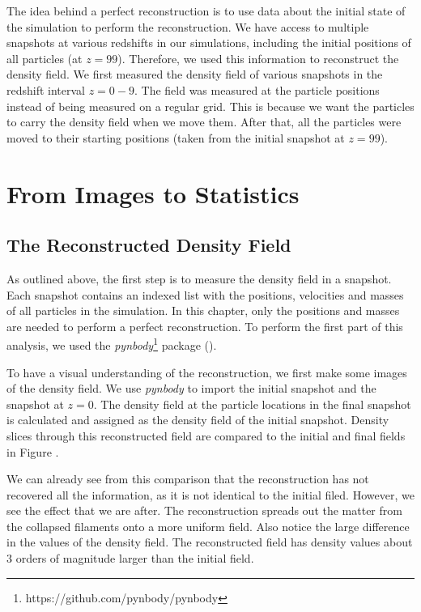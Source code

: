 
The idea behind a perfect reconstruction is to use data about the initial state of the simulation to perform the reconstruction. We have access to multiple snapshots at various redshifts in our simulations, including the initial positions of all particles (at $z = 99$). Therefore, we used this information to reconstruct the density field. We first measured the density field of various snapshots in the redshift interval $z = 0 - 9$. The field was measured at the particle positions instead of being measured on a regular grid. This is because we want the particles to carry the density field when we move them. After that, all the particles were moved to their starting positions (taken from the initial snapshot at $z = 99$).




\section{From Images to Statistics}


\subsection{The Reconstructed Density Field}

As outlined above, the first step is to measure the density field in a snapshot. Each snapshot contains an indexed list with the positions, velocities and masses of all particles in the simulation. In this chapter, only the positions and masses are needed to perform a perfect reconstruction. To perform the first part of this analysis, we used the \textit{pynbody}\footnote{https://github.com/pynbody/pynbody} package (\cite{2013ascl.soft05002P}). 

To have a visual understanding of the reconstruction, we first make some images of the density field. We use \textit{pynbody} to import the initial snapshot and the snapshot at $z=0$. The density field at the particle locations in the final snapshot is calculated and assigned as the density field of the initial snapshot. Density slices through this reconstructed field are compared to the initial and final fields in Figure . 

We can already see from this comparison that the reconstruction has not recovered all the information, as it is not identical to the initial filed. However, we see the effect that we are after. The reconstruction spreads out the matter from the collapsed filaments onto a more uniform field. Also notice the large difference in the values of the density field. The reconstructed field has density values about 3 orders of magnitude larger than the initial field. 

